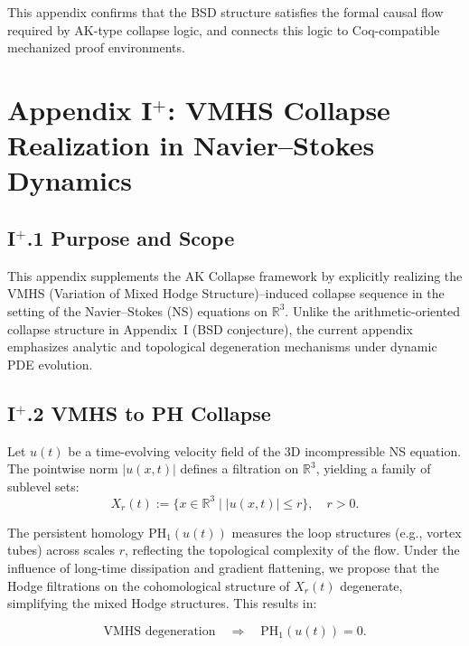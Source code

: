 \documentclass[11pt]{article}
\begin{document}
This appendix confirms that the BSD structure satisfies the  
formal causal flow required by AK-type collapse logic, and connects this logic  
to Coq-compatible mechanized proof environments.




\section*{Appendix I$^+$: VMHS Collapse Realization in Navier--Stokes Dynamics}

\subsection*{I$^+$.1 Purpose and Scope}

This appendix supplements the AK Collapse framework by explicitly realizing  
the VMHS (Variation of Mixed Hodge Structure)–induced collapse sequence  
in the setting of the Navier--Stokes (NS) equations on \( \mathbb{R}^3 \).  
Unlike the arithmetic-oriented collapse structure in Appendix~I (BSD conjecture),  
the current appendix emphasizes analytic and topological degeneration mechanisms  
under dynamic PDE evolution.

\subsection*{I$^+$.2 VMHS to PH Collapse}

Let \( u(t) \) be a time-evolving velocity field of the 3D incompressible NS equation.  
The pointwise norm \( |u(x,t)| \) defines a filtration on \( \mathbb{R}^3 \),  
yielding a family of sublevel sets:
\[
X_r(t) := \{ x \in \mathbb{R}^3 \mid |u(x,t)| \leq r \}, \quad r > 0.
\]

The persistent homology \( \mathrm{PH}_1(u(t)) \) measures the loop structures (e.g., vortex tubes)  
across scales \( r \), reflecting the topological complexity of the flow.  
Under the influence of long-time dissipation and gradient flattening,  
we propose that the Hodge filtrations on the cohomological structure  
of \( X_r(t) \) degenerate, simplifying the mixed Hodge structures.  
This results in:

\[
\text{VMHS degeneration} \quad \Rightarrow \quad \mathrm{PH}_1(u(t)) = 0.
\]
\end{document}
